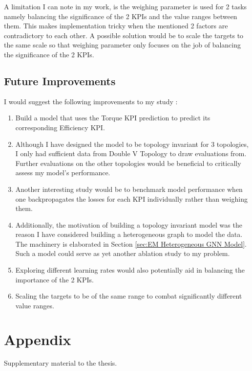 \documentclass{report} %
\begin{document}
A limitation I can note in my work, is the weighing parameter is used for 2 tasks namely balancing the significance of the 2 \ac{KPI}s and the value ranges between them. 
This makes implementation tricky when the mentioned 2 factors are contradictory to each other. A possible solution would be to scale the targets to the same scale so 
that weighing parameter only focuses on the job of balancing the significance of the 2 \ac{KPI}s.\\

\section{Future Improvements}\label{sec:Future Improvements}
I would suggest the following improvements to my study : 

\begin{enumerate}[nosep]
    \item Build a model that uses the Torque \ac{KPI} prediction to predict its corresponding Efficiency \ac{KPI}. 
    \item Although I have designed the model to be topology invariant for 3 topologies, I only had sufficient data from Double V Topology to draw evaluations from.
    Further evaluations on the other topologies would be beneficial to critically assess my model's performance.
    \item Another interesting study would be to benchmark model performance when one backpropagates the losses for each \ac{KPI} individually rather than weighing them.
    \item Additionally, the motivation of building a topology invariant model was the reason I have considered building a heterogeneous graph to model the data. The machinery is elaborated in Section \ref{sec:EM Heterogeneous GNN Model}.
    Such a model could serve as yet another ablation study to my problem.
    \item Exploring different learning rates would also potentially aid in balancing the importance of the 2 \ac{KPI}s.
    \item Scaling the targets to be of the same range to combat significantly different value ranges.
\end{enumerate}

\newpage 

\appendix
\chapter{Appendix}
Supplementary material to the thesis.
\end{document}
